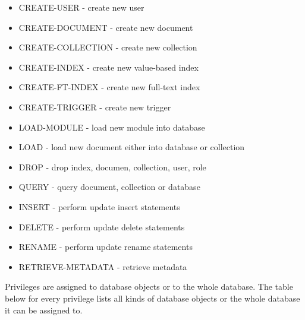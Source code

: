 \documentclass[a4paper,12pt]{article}
\newenvironment{citemize}
{\begin{itemize}
  \setlength{\itemsep}{0pt}
  \setlength{\parskip}{0pt}
  \setlength{\parsep}{0pt}}
{\end{itemize}}
\begin{document}
\begin{citemize}
\item CREATE-USER - create new user
\item CREATE-DOCUMENT - create new document
\item CREATE-COLLECTION - create new collection
\item CREATE-INDEX - create new value-based index
\item CREATE-FT-INDEX - create new full-text index
\item CREATE-TRIGGER - create new trigger
\item LOAD-MODULE - load new module into database
\item LOAD - load new document either into database or collection
\item DROP - drop index, documen, collection, user, role
\item QUERY - query document, collection or database
\item INSERT - perform update insert statements
\item DELETE - perform update delete statements
\item RENAME - perform update rename statements
\item RETRIEVE-METADATA - retrieve metadata
\end{citemize}

Privileges are assigned to database objects or to the whole database. The table
below for every privilege lists all kinds of database objects or the whole
database it can be assigned to.

\medskip
\end{document}
